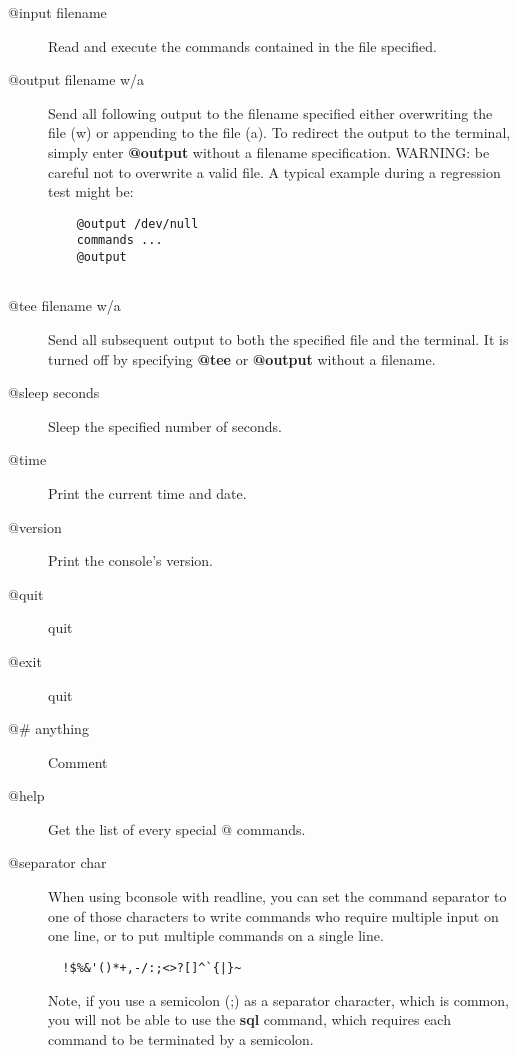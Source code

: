 \begin{description}

\item [@input \lt{}filename\gt{}]
   Read and execute the commands  contained in the file specified.  

\item [@output \lt{}filename\gt{} w/a]
   Send all following output to the  filename specified either overwriting the
file (w) or appending to  the file (a). To redirect the output to the
terminal, simply enter  {\bf @output} without a filename specification.
WARNING: be careful  not to overwrite a valid file. A typical example during a
regression  test might be:  

\footnotesize
\begin{verbatim}
    @output /dev/null
    commands ...
    @output
    
\end{verbatim}
\normalsize

\item [@tee \lt{}filename\gt{} w/a]
   Send all subsequent output to  both the specified file and the terminal. It is
   turned off by  specifying {\bf @tee} or {\bf @output} without a filename.  

\item [@sleep \lt{}seconds\gt{}]
   Sleep the specified number of seconds.  

\item [@time]
   Print the current time and date.  

\item [@version]
   Print the console's version.  

\item [@quit]
   quit  

\item [@exit]
   quit  

\item [@\# anything]
   Comment 

\item [@help]
   Get the list of every special @ commands.

\item [@separator \lt{}char\gt{}]
  When using bconsole with readline, you can set the command separator to one
  of those characters to write commands who require multiple input on one line,
  or to put multiple commands on a single line.
\begin{verbatim}
  !$%&'()*+,-/:;<>?[]^`{|}~
\end{verbatim}

  Note, if you use a semicolon (;) as a separator character, which is
  common, you will not be able to use the {\bf sql} command, which 
  requires each command to be terminated by a semicolon.

\end{description}

